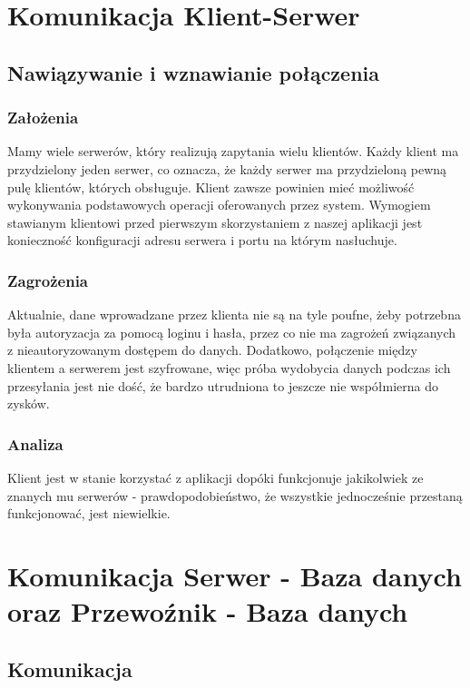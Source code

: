 \documentclass[pdftex,13pt,a4paper]{article}
\begin{document}
\section{Komunikacja Klient-Serwer}

\subsection{Nawiązywanie i wznawianie połączenia}

\subsubsection{Założenia}
Mamy wiele serwerów, który realizują zapytania wielu klientów. Każdy klient ma przydzielony jeden serwer, co oznacza, że każdy serwer ma przydzieloną pewną pulę klientów, których obsługuje. Klient zawsze powinien mieć możliwość wykonywania podstawowych operacji oferowanych przez system.
Wymogiem stawianym klientowi przed pierwszym skorzystaniem z naszej aplikacji jest konieczność konfiguracji adresu serwera i portu na którym nasłuchuje.

\subsubsection{Zagrożenia}
Aktualnie, dane wprowadzane przez klienta nie są na tyle poufne, żeby potrzebna była autoryzacja za pomocą loginu i hasła, przez co nie ma zagrożeń związanych z nieautoryzowanym dostępem do danych. Dodatkowo, połączenie między klientem a serwerem jest szyfrowane, więc próba wydobycia danych podczas ich przesyłania jest nie dość, że bardzo utrudniona to jeszcze nie współmierna do zysków.

\subsubsection{Analiza}
Klient jest w stanie korzystać z aplikacji dopóki funkcjonuje jakikolwiek ze znanych mu serwerów - prawdopodobieństwo,
że wszystkie jednocześnie przestaną funkcjonować, jest niewielkie.



\section{Komunikacja Serwer - Baza danych oraz Przewoźnik - Baza danych}

\subsection{Komunikacja}
\end{document}

